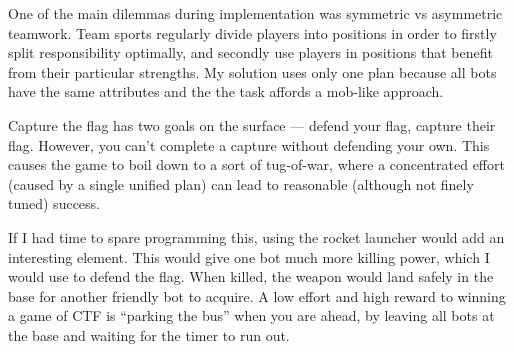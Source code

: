 \documentclass[a4paper,12pt]{article}
\begin{document}


One of the main dilemmas during implementation was symmetric vs asymmetric teamwork. Team sports  regularly divide players into positions in order to firstly split responsibility optimally, and secondly use players in positions that benefit from their particular strengths. My solution uses only one plan because all bots have the same attributes and the the task affords a mob-like approach.

Capture the flag has two goals on the surface --- defend your flag, capture their flag. However, you can't complete a capture without defending your own. This causes the game to boil down to a sort of tug-of-war, where a concentrated effort (caused by a single unified plan) can lead to reasonable (although not finely tuned) success.

If I had time to spare programming this, using the rocket launcher would add an interesting element. This would give one bot much more killing power, which I would use to defend the flag. When killed, the weapon would land safely in the base for another friendly bot to acquire. A low effort and high reward to winning a game of CTF is ``parking the bus'' when you are ahead, by leaving all bots at the base and waiting for the timer to run out.

\appendix
\end{document}
